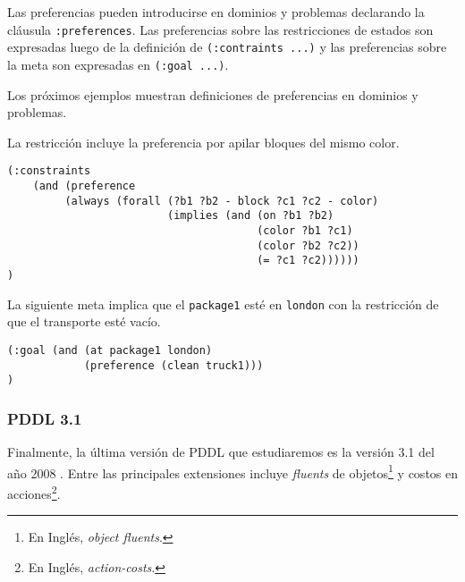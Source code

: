 \begin{itemize}
	Las preferencias pueden introducirse en dominios y problemas
        declarando la cl\'ausula
	\texttt{:pre\-fe\-ren\-ces}. Las preferencias sobre las restricciones de estados
	son expresadas luego de la definici\'on de \texttt{(:contraints ...)} y
	las preferencias sobre la meta son expresadas en \texttt{(:goal ...)}.
	
	Los pr\'oximos ejemplos muestran definiciones de preferencias en
	dominios y problemas.
	
	\begin{ejemplo}%
	
	La restricci\'on incluye la preferencia por apilar
	bloques del mismo color.
	
	\begin{verbatim}
(:constraints
    (and (preference
         (always (forall (?b1 ?b2 - block ?c1 ?c2 - color)
                         (implies (and (on ?b1 ?b2)
                                       (color ?b1 ?c1)
                                       (color ?b2 ?c2))
                                       (= ?c1 ?c2))))))
)
        \end{verbatim}
	\end{ejemplo}
	
	\begin{ejemplo}%
	
	La siguiente meta implica que el \texttt{package1}
	est\'e en \texttt{london} con la restricci\'on de que el
	transporte est\'e vac\'io.
	
	\begin{verbatim}
(:goal (and (at package1 london) 
            (preference (clean truck1)))
)
	\end{verbatim}        
	\end{ejemplo}
	\end{itemize}
	

\subsubsection{PDDL 3.1}

Finalmente, la \'ultima versi\'on de PDDL que estudiaremos es 
la versi\'on 3.1 del a\~{n}o 2008 \cite{gbraun:pddl31}. 
Entre las principales extensiones incluye
\emph{fluents} de objetos\footnote{En Ingl\'es, \emph{object fluents}.} y costos en 
acciones\footnote{En Ingl\'es, \emph{action-costs}.}.



